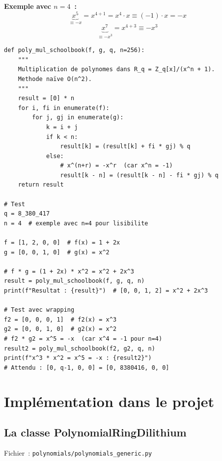 \documentclass[12pt, a4paper]{article}
\begin{document}
\textbf{Exemple avec $n = 4$~:}
$$\underbrace{x^5}_{\equiv -x} = x^{4+1} = x^4 \cdot x \equiv (-1) \cdot x = -x$$
$$\underbrace{x^7}_{\equiv -x^3} = x^{4+3} \equiv -x^3$$

\begin{lstlisting}[style=python]
def poly_mul_schoolbook(f, g, q, n=256):
    """
    Multiplication de polynomes dans R_q = Z_q[x]/(x^n + 1).
    Methode naïve O(n^2).
    """
    result = [0] * n
    for i, fi in enumerate(f):
        for j, gj in enumerate(g):
            k = i + j
            if k < n:
                result[k] = (result[k] + fi * gj) % q
            else:
                # x^(n+r) = -x^r  (car x^n = -1)
                result[k - n] = (result[k - n] - fi * gj) % q
    return result

# Test
q = 8_380_417
n = 4  # exemple avec n=4 pour lisibilite

f = [1, 2, 0, 0]  # f(x) = 1 + 2x
g = [0, 0, 1, 0]  # g(x) = x^2

# f * g = (1 + 2x) * x^2 = x^2 + 2x^3
result = poly_mul_schoolbook(f, g, q, n)
print(f"Resultat : {result}")  # [0, 0, 1, 2] = x^2 + 2x^3

# Test avec wrapping
f2 = [0, 0, 0, 1]  # f2(x) = x^3
g2 = [0, 0, 1, 0]  # g2(x) = x^2
# f2 * g2 = x^5 = -x  (car x^4 = -1 pour n=4)
result2 = poly_mul_schoolbook(f2, g2, q, n)
print(f"x^3 * x^2 = x^5 = -x : {result2}")
# Attendu : [0, q-1, 0, 0] = [0, 8380416, 0, 0]
\end{lstlisting}

\section{Implémentation dans le projet}

\subsection{La classe PolynomialRingDilithium}

Fichier~: \texttt{polynomials/polynomials\_generic.py}
\end{document}
